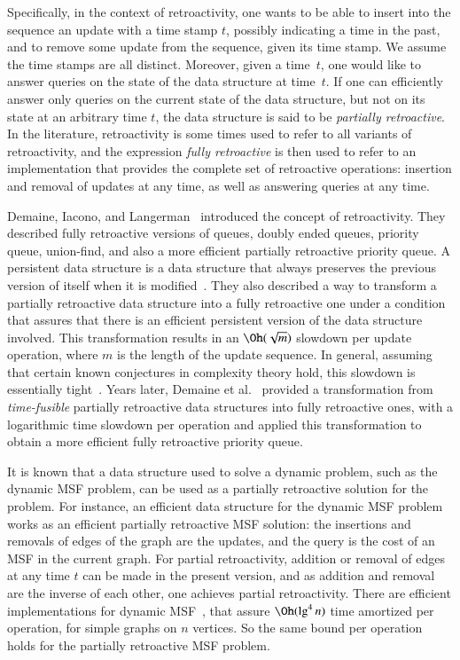 \documentclass[3p,times,procedia]{elsarticle}
\begin{document}
Specifically, in the context of retroactivity, one wants to be able to insert into 
the sequence an update with a time stamp $t$, possibly indicating a time in the past, 
and to remove some update from the sequence, given its time stamp.
We assume the time stamps are all distinct.  Moreover, given a time~$t$, 
one would like to answer queries on the state of the data structure at time~$t$. 
If one can efficiently answer only queries on the current state of the data structure, 
but not on its state at an arbitrary time $t$, the data structure is said to be 
\emph{partially retroactive}.  In the literature, retroactivity is some times used 
to refer to all variants of retroactivity, and the expression \emph{fully retroactive}
is then used to refer to an implementation that provides the complete set of retroactive
operations: insertion and removal of updates at any time, as well as answering queries 
at any time. 

Demaine, Iacono, and Langerman~\cite{DemaineIL2007} introduced the concept of retroactivity. 
They described fully retroactive versions of queues, doubly ended queues, priority 
queue, union-find, and also a more efficient partially retroactive priority queue.
A persistent data structure is a data structure that always preserves the 
previous version of itself when it is modified~\cite{DriscollSST1989}.
They also described a way to transform a partially retroactive data structure 
into a fully retroactive one under a condition that assures that there is 
an efficient persistent version of the data structure involved.  
This transformation results in an $\Oh(\sqrt{m})$ 
slowdown per update operation, where $m$ is the length of the update sequence.
In general, assuming that certain known conjectures in complexity theory hold, 
this slowdown is essentially tight~\cite{ChenDGWXY2018}.
Years later, Demaine et al.~\cite{DemaineKLSY2015} provided a transformation 
from \emph{time-fusible} partially retroactive data structures into fully
retroactive ones, with a logarithmic time slowdown per operation and applied
this transformation to obtain a more efficient fully retroactive priority queue.

It is known that a data structure used to solve a dynamic problem, such as the 
dynamic MSF problem, can be used as a partially retroactive solution for the problem.  
For instance, an efficient data structure for the dynamic MSF problem works as an 
efficient partially retroactive MSF solution: the insertions and removals of edges 
of the graph are the updates, and the query is the cost of an MSF in the current graph.  
For partial retroactivity, addition or removal of edges at any time $t$ can be made 
in the present version, and as addition and removal are the inverse of each other, 
one achieves partial retroactivity.  
There are efficient implementations for dynamic MSF~\cite{HolmLT2001,HolmRWN2015}, 
that assure $\Oh(\lg^4 n)$ time amortized per operation, for simple graphs on $n$ vertices. 
So the same bound per operation holds for the partially retroactive MSF problem. 
\end{document}
